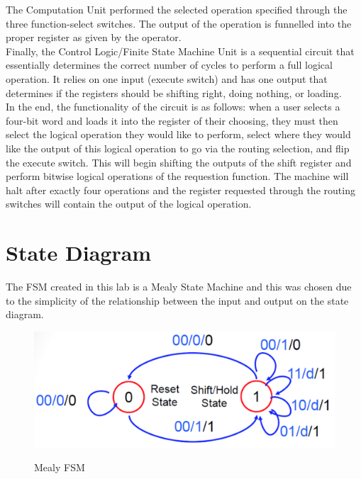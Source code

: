 \documentclass[journal, twocolumn, final,11pt,letterpaper]{IEEEtran}
\begin{document}
The Computation Unit performed the selected operation specified through the three function-select switches. The output of the operation is funnelled into the proper register as given by the operator. \\

Finally, the Control Logic/Finite State Machine Unit is a sequential circuit that essentially determines the correct  number of cycles to perform a full logical operation. It relies on one input (execute switch) and has one output that determines if the registers should be shifting right, doing nothing, or loading. \\

In the end, the functionality of the circuit is as follows: when a user selects a four-bit word and loads it into the register of their choosing, they must then select the logical operation they would like to perform, select where they would like the output of this logical operation to go via the routing selection, and flip the execute switch. This will begin shifting the outputs of the shift register and perform bitwise logical operations of the requestion function. The machine will halt after exactly four operations and the register requested through the routing switches will contain the output of the logical operation. \\

\section{State Diagram}
The FSM created in this lab is a Mealy State Machine and this was chosen due to the simplicity of the relationship between the input and output on the state diagram.

\begin{figure} [H]
	\centering
	\includegraphics[scale=0.35]{FSM.png}
	\label{fig:mealy-fsm}
	\caption{Mealy FSM}
\end{figure}    

\end{document}
